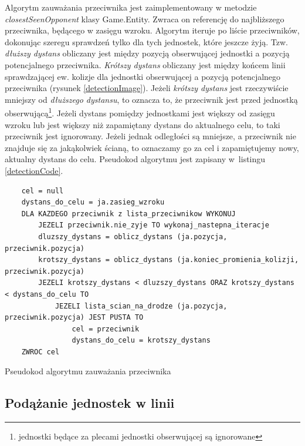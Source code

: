 Algorytm zauważania przeciwnika jest zaimplementowany w metodzie \emph{closestSeenOpponent} klasy Game.Entity. Zwraca on referencję do najbliższego przeciwnika, będącego w zasięgu wzroku. Algorytm iteruje po liście przeciwników, dokonując szeregu sprawdzeń tylko dla tych jednostek, które jeszcze żyją. Tzw. \emph{dłuższy dystans} obliczany jest między pozycją obserwującej jednostki a pozycją potencjalnego przeciwnika. \emph{Krótszy dystans} obliczany jest między końcem linii sprawdzającej ew. kolizje dla jednostki obserwującej a pozycją potencjalnego przeciwnika (rysunek \ref{detectionImage}). Jeżeli \emph{krótszy dystans} jest rzeczywiście mniejszy od \emph{dłuższego dystansu}, to oznacza to, że przeciwnik jest przed jednostką obserwującą\footnote{jednostki będące za plecami jednostki obserwującej są ignorowane}. Jeżeli dystans pomiędzy jednostkami jest większy od zasięgu wzroku lub jest większy niż zapamiętany dystans do aktualnego celu, to taki przeciwnik jest ignorowany. Jeżeli jednak odległości są mniejsze, a przeciwnik nie znajduje się za jakąkolwiek ścianą, to oznaczamy go za cel i zapamiętujemy nowy, aktualny dystans do celu. Pseudokod algorytmu jest zapisany w~listingu \ref{detectionCode}.

\begin{table}
\begin{center}
\begin{lstlisting}
	cel = null
	dystans_do_celu = ja.zasieg_wzroku
	DLA KAZDEGO przeciwnik z lista_przeciwnikow WYKONUJ
		JEZELI przeciwnik.nie_zyje TO wykonaj_nastepna_iteracje
		dluzszy_dystans = oblicz_dystans (ja.pozycja, przeciwnik.pozycja)
		krotszy_dystans = oblicz_dystans (ja.koniec_promienia_kolizji, przeciwnik.pozycja)
		JEZELI krotszy_dystans < dluzszy_dystans ORAZ krotszy_dystans < dystans_do_celu TO
			JEZELI lista_scian_na_drodze (ja.pozycja, przeciwnik.pozycja) JEST PUSTA TO
				cel = przeciwnik
				dystans_do_celu = krotszy_dystans		
	ZWROC cel	
\end{lstlisting}
\caption {Pseudokod algorytmu zauważania przeciwnika}
\label{detectionCode}
\end{center}
\end{table}

\subsection{Podążanie jednostek w linii}

